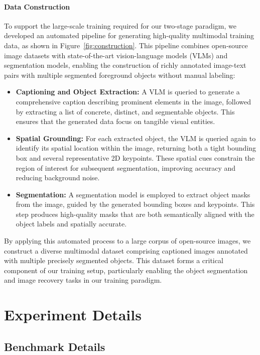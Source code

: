 \paragraph{Data Construction}
To support the large-scale training required for our two-stage paradigm, we developed an automated pipeline for generating high-quality multimodal training data, as shown in Figure~\ref{fig:construction}. This pipeline combines open-source image datasets with state-of-the-art vision-language models (VLMs) and segmentation models, enabling the construction of richly annotated image-text pairs with multiple segmented foreground objects without manual labeling:

\begin{itemize}[left=2pt]
\item \textbf{Captioning and Object Extraction:} A VLM is queried to generate a comprehensive caption describing prominent elements in the image, followed by extracting a list of concrete, distinct, and segmentable objects. This ensures that the generated data focus on tangible visual entities.
\item \textbf{Spatial Grounding:} For each extracted object, the VLM is queried again to identify its spatial location within the image, returning both a tight bounding box and several representative 2D keypoints. These spatial cues constrain the region of interest for subsequent segmentation, improving accuracy and reducing background noise.
\item \textbf{Segmentation:} A segmentation model is employed to extract object masks from the image, guided by the generated bounding boxes and keypoints. This step produces high-quality masks that are both semantically aligned with the object labels and spatially accurate.
\end{itemize}

By applying this automated process to a large corpus of open-source images, we construct a diverse multimodal dataset comprising captioned images annotated with multiple precisely segmented objects. This dataset forms a critical component of our training setup, particularly enabling the object segmentation and image recovery tasks in our training paradigm.


\section{Experiment Details}
\label{sec:Experiment_Details}

\subsection{Benchmark Details}
\label{sec:Benchmark_Details}

